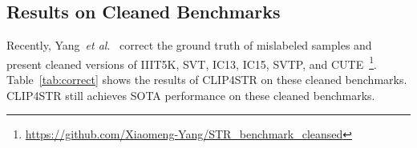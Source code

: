 \documentclass[lettersize,journal]{IEEEtran}
\newcommand{\etal}{\textit{et al}.}
\begin{document}
\begin{table}[!t]
    \centering
    \caption{\textbf{Word accuracy on cleaned benchmarks}. Mislabeled samples in {\color{blue}blue benchmarks} are cleaned by Yang~\etal~\cite{yang2023masked}.
    All methods are trained on 3.3M real samples.
    The best results are highlighted.}
  \label{tab:correct}
\end{table} 
\subsection{Results on Cleaned Benchmarks} \label{sec:clean_data}
Recently, Yang~\etal~\cite{yang2023masked} correct the ground truth of mislabeled samples and present cleaned versions of IIIT5K, SVT, IC13, IC15, SVTP, and CUTE~\footnote{\url{https://github.com/Xiaomeng-Yang/STR_benchmark_cleansed}}.
Table~\ref{tab:correct} shows the results of CLIP4STR on these cleaned benchmarks. CLIP4STR still achieves SOTA performance on these cleaned benchmarks. 
\end{document}

